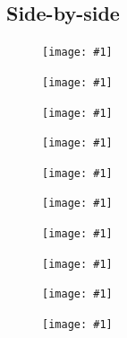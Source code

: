 \documentclass[11pt]{article}
\begin{document}
	\subsection{Side-by-side}
	\renewcommand\trimmedgraphic[1]{%
		\texttt{[image: \#1]}%
		}
	\begin{figure}[H]
		\centering
		\trimmedgraphic{pictures/dodPilots/music1.png}
		\trimmedgraphic{pictures/dodPilots/silence1.png}
		\trimmedgraphic{pictures/dodPilots/music2.png}
		\trimmedgraphic{pictures/dodPilots/silence2.png}
		\trimmedgraphic{pictures/dodPilots/music3.png}
		\trimmedgraphic{pictures/dodPilots/silence3.png}
		\trimmedgraphic{pictures/dodPilots/music4.png}
		\trimmedgraphic{pictures/dodPilots/silence4.png}
		\trimmedgraphic{pictures/dodPilots/music5.png}
		\trimmedgraphic{pictures/dodPilots/silence5.png}
	\end{figure}
\end{document}
